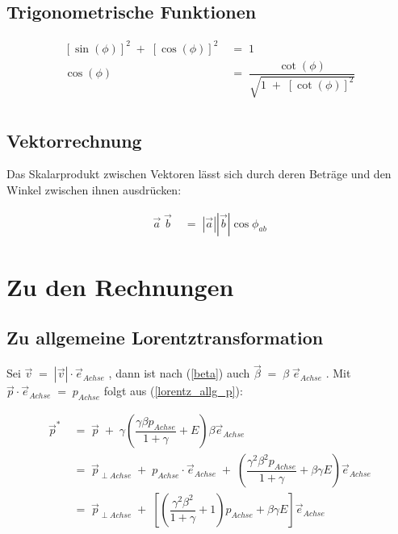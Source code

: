\documentclass[
a4paper,                                %
twoside,                                %
BCOR1.4cm,                      %
ngerman,                                %
10pt,                           %
headings=normal,                %
headsepline,                    %
clearplainpage, %
final,                                  %
div=14,
parskip=full
]{scrbook}
\begin{document}
\subsection{Trigonometrische Funktionen}

\begin{align}
	\left[\sin (\phi)\right]^{2}\;+\;\left[\cos (\phi)\right]^{2}
\;&=\;1
\\
	\cos (\phi)
\;&=\;
	\dfrac{\cot (\phi)}
	{\sqrt{1\;+\;\left[\cot (\phi) \right]^{2}}}
\\
\nonumber
\end{align}

\subsection{Vektorrechnung}

Das Skalarprodukt zwischen Vektoren l\"asst sich durch deren Betr\"age und den Winkel zwischen ihnen ausdr\"ucken:

\begin{align}
	\vec{a}\;\vec{b}
\;&=\;
	|\vec{a}| |\vec{b}| \cos \phi_{ab}
\label{skalarp}
\end{align}

\section{Zu den Rechnungen}

\subsection{Zu allgemeine Lorentztransformation}\label{anhanglorentz}

Sei 
$ \vec{v}\;=\;|\vec{v}| \cdot \vec{e}_{Achse} $
, dann ist nach (\ref{beta}) auch 
$ \vec{\beta}\;=\;\beta\;\vec{e}_{Achse} $
. Mit 
$ \vec{p} \cdot \vec{e}_{Achse}\;=\;p_{Achse} $
folgt aus (\ref{lorentz_allg_p}):

\begin{align}
	\vec{p}^{*}
\;&=\;
	\vec{p}\;+\;\gamma
	\left(
		\dfrac{\gamma \beta p_{Achse}}{1 + \gamma} + E
	\right)
	\beta \vec{e}_{Achse}
\nonumber
\\
\;&=\;
	\vec{p}_{\perp Achse}\;+\;p_{Achse}\cdot \vec{e}_{Achse}\;+\;
	\left(
		\dfrac{\gamma^{2} \beta^{2} p_{Achse}}{1 + \gamma} + \beta \gamma E
	\right)
	\vec{e}_{Achse}
\nonumber
\\
\;&=\;
	\vec{p}_{\perp Achse}\;+\;
	\left[
		\left(
			\dfrac{\gamma^{2} \beta^{2} }{1 + \gamma} + 1
		\right) p_{Achse}
		+ \beta \gamma E
	\right]
	\vec{e}_{Achse}
\nonumber
\end{align}
\end{document}
